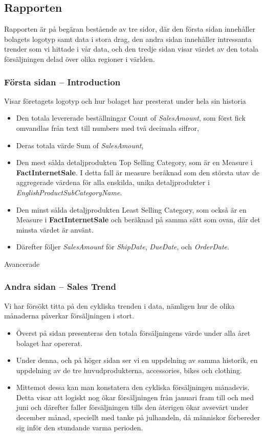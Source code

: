 \documentclass[10pt]{article}
\begin{document}
\subsection{Rapporten}

Rapporten är på begäran bestående av tre sidor, där den första sidan innehåller bolagets logotyp samt data i stora drag, den andra sidan innehåller intressanta trender som vi hittade i vår data, och den tredje sidan visar värdet av den totala försäljningen delad över olika regioner i världen.

\subsubsection{Första sidan -- Introduction}

Visar företagets logotyp och hur bolaget har presterat under hela sin historia

\begin{itemize}
	\item Den totala levererade beställningar Count of \emph{SalesAmount}, som först fick omvandlas från text till numbers med två decimala siffror,
	\item Deras totala värde Sum of \emph{SalesAmount},
	\item Den mest sålda detaljprodukten Top Selling Category, som är en Measure i \textbf{FactInternetSale}. I detta fall är measure beräknad som den största utav de aggregerade värdena för alla enskilda, unika detaljprodukter i \emph{EnglishProductSubCategoryName}.
	\item Den minst sålda detaljprodukten Least Selling Category, som också är en Measure i \textbf{FactInternetSale} och beräknad på samma sätt som ovan, där det minsta värdet är använt.
	\item Därefter följer \emph{SalesAmount} för \emph{ShipDate}, \emph{DueDate}, och \emph{OrderDate}.
\end{itemize}

Avancerade 

\subsubsection{Andra sidan -- Sales Trend}

Vi har försökt titta på den cykliska trenden i data, nämligen hur de olika månaderna påverkar försäljningen i stort.

\begin{itemize}
	\item Överst på sidan presenteras den totala försäljningens värde under alla året bolaget har opererat.
	\item Under denna, och på höger sidan ser vi en uppdelning av samma historik, en uppdelning av de tre huvudprodukterna, accessories, bikes och clothing.
	\item Mittemot dessa kan man konstatera den cykliska försäljningen månadsvis. Detta visar att logiskt nog ökar försäljningen från januari fram till och med juni och därefter faller försäljningen tills den återigen ökar avsevärt under december månad, speciellt med tanke på julhandeln, då människor förbereder sig inför den stundande varma perioden.
\end{itemize}
\end{document}
